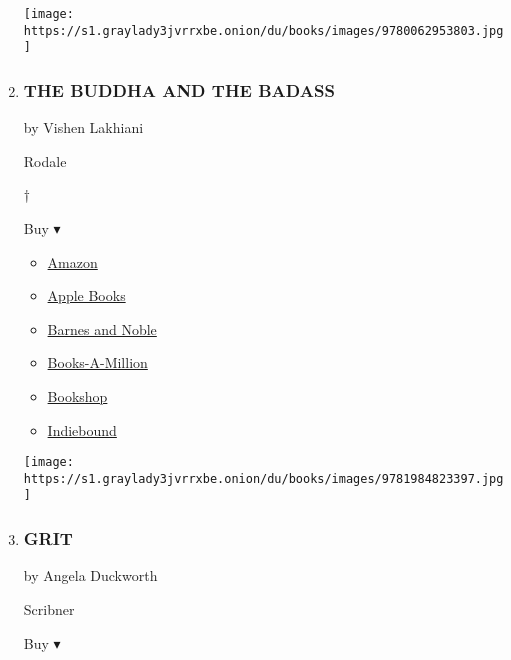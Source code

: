 \begin{enumerate}
  \texttt{[image: https://s1.graylady3jvrrxbe.onion/du/books/images/9780062953803.jpg]}
\item
  \hypertarget{the-buddha-and-the-badass}{%
  \subsubsection{THE BUDDHA AND THE
  BADASS}\label{the-buddha-and-the-badass}}

  by Vishen Lakhiani

  Rodale

  †

  Buy ▾

  \begin{itemize}
  \tightlist
  \item
    \href{https://www.amazon.com/dp/1984823396?tag=NYTBSREV-20\&tag=NYTBS-20}{Amazon}
  \item
    \href{https://du-gae-books-dot-nyt-du-prd.appspot.com/buy?title=THE+BUDDHA+AND+THE+BADASS\&author=Vishen+Lakhiani}{Apple
    Books}
  \item
    \href{https://www.anrdoezrs.net/click-7990613-11819508?url=https\%3A\%2F\%2Fwww.barnesandnoble.com\%2Fw\%2F\%3Fean\%3D9781984823397}{Barnes
    and Noble}
  \item
    \href{https://www.anrdoezrs.net/click-7990613-35140?url=https\%3A\%2F\%2Fwww.booksamillion.com\%2Fp\%2FTHE\%2BBUDDHA\%2BAND\%2BTHE\%2BBADASS\%2FVishen\%2BLakhiani\%2F9781984823397}{Books-A-Million}
  \item
    \href{https://bookshop.org/a/3546/9781984823397}{Bookshop}
  \item
    \href{https://www.indiebound.org/book/9781984823397?aff=NYT}{Indiebound}
  \end{itemize}

  \texttt{[image: https://s1.graylady3jvrrxbe.onion/du/books/images/9781984823397.jpg]}
\item
  \href{https://www.nytimes3xbfgragh.onion/2016/05/08/books/review/grit-by-angela-duckworth.html}{}

  \hypertarget{grit}{%
  \subsubsection{GRIT}\label{grit}}

  by Angela Duckworth

  Scribner

  Buy ▾


\end{enumerate}
